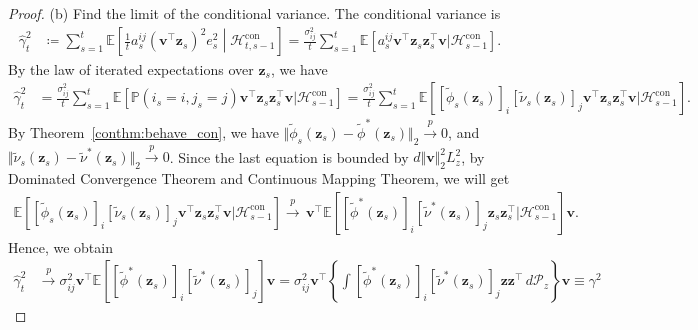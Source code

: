 \documentclass[12pt]{article}
\begin{document}
\begin{proof}
(b) Find the limit of the conditional variance. The conditional variance is
\begin{align*}
    \widehat{\gamma}_t^2 &\coloneqq \sum_{s=1}^t \mathbb{E} \left[ \frac{1}{t} a_s^{ij} (\bm{v}^\top \bm{z}_s)^2 e_s^2 \middle| \mathcal{H}^{\mathrm{con}}_{t,s-1} \right]
    = \frac{\sigma_{ij}^2}{t} \sum_{s=1}^t \mathbb{E} \left[a_s^{ij} \bm{v}^\top \bm{z}_s \bm{z}_s^\top \bm{v}  | \mathcal{H}^{\mathrm{con}}_{s-1} \right].
\end{align*}
By the law of iterated expectations over $\bm{z}_s$, we have
\begin{align*}
    \widehat{\gamma}_t^2 & = \frac{\sigma_{ij}^2}{t} \sum_{s=1}^t \mathbb{E}\left[ \mathbb{P}(i_s=i,j_s=j) \bm{v}^\top \bm{z}_s \bm{z}_s^\top \bm{v}  | \mathcal{H}^{\mathrm{con}}_{s-1} \right] 
    = \frac{\sigma_{ij}^2}{t} \sum_{s=1}^t \mathbb{E}\left[[\widetilde{\phi}_s(\bm{z}_s)]_i [\widetilde{\nu}_s(\bm{z}_s)]_j \bm{v}^\top \bm{z}_s \bm{z}_s^\top \bm{v}  | \mathcal{H}^{\mathrm{con}}_{s-1} \right].
\end{align*}
By Theorem~\ref{conthm:behave_con}, we have $\Vert \widetilde{\phi}_s(\bm{z}_s) - \widetilde \phi^\ast(\bm{z}_s) \Vert_2 \stackrel{p}{\to} 0$, and $\Vert \widetilde{\nu}_s(\bm{z}_s) - \widetilde \nu^\ast(\bm{z}_s) \Vert_2 \stackrel{p}{\to} 0$. Since the last equation is bounded by $d\Vert \bm{v} \Vert_2^2 L_z^2$, by Dominated Convergence Theorem and Continuous Mapping Theorem, we will get
\begin{align*}
    \mathbb{E}\left[[\widetilde{\phi}_s(\bm{z}_s)]_i [\widetilde{\nu}_s(\bm{z}_s)]_j \bm{v}^\top \bm{z}_s \bm{z}_s^\top \bm{v}  | \mathcal{H}^{\mathrm{con}}_{s-1} \right] \stackrel{p}{\to} \, \bm{v}^\top \mathbb{E}\left[ [\widetilde \phi^\ast(\bm{z}_s)]_i [\widetilde \nu^\ast(\bm{z}_s)]_j \bm{z}_s \bm{z}_s^\top | \mathcal{H}^{\mathrm{con}}_{s-1} \right] \bm{v} .
\end{align*}
Hence, we obtain 
\begin{align*}
    \widehat{\gamma}_t^2 & \stackrel{p}{\to} \sigma_{ij}^2 \bm{v}^\top \mathbb{E}\left[ [\widetilde \phi^\ast(\bm{z}_s)]_i [\widetilde \nu^\ast(\bm{z}_s)]_j \right] \bm{v} 
    = \sigma_{ij}^2 \bm{v}^\top \left\{ \int [\widetilde \phi^\ast(\bm{z}_s)]_i [\widetilde \nu^\ast(\bm{z}_s)]_j \bm{z} \bm{z}^\top \,d\mathcal{P}_z \right\}\bm{v} \equiv \gamma^2
\end{align*}

\end{proof}
\end{document}

